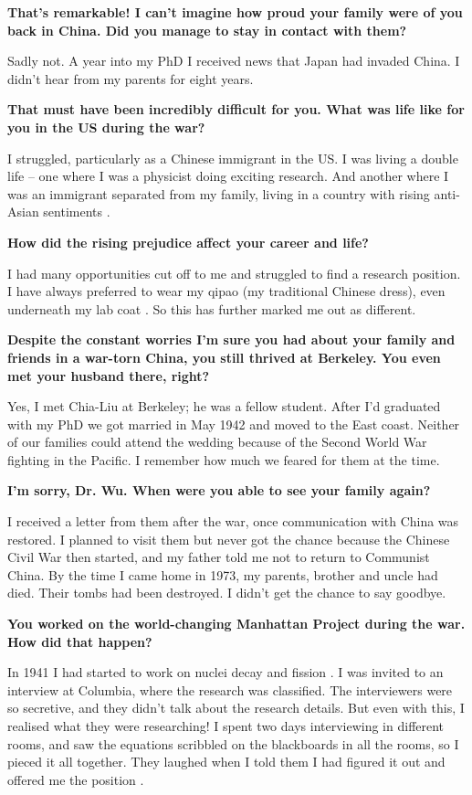 \documentclass{article}
\newcommand{\q}[1]{\vspace{10pt}
\textbf{#1}
\vspace{0pt}}
\begin{document}
\begin{multicols}{2}
\q{That’s remarkable! I can’t imagine how proud your family were of you back in China. Did you manage to stay in contact with them?}

Sadly not. A year into my PhD I received news that Japan had invaded China. I didn’t hear from my parents for eight years.

\q{That must have been incredibly difficult for you. What was life like for you in the US during the war?}

I struggled, particularly as a Chinese immigrant in the US. I was living a double life – one where I was a physicist doing exciting research. And another where I was an immigrant separated from my family, living in a country with rising anti-Asian sentiments \cite{N2}.

\q{How did the rising prejudice affect your career and life?}

I had many opportunities cut off to me and struggled to find a research position. I have always preferred to wear my qipao (my traditional Chinese dress), even underneath my lab coat \cite{N3}. So this has further marked me out as different.

\q{Despite the constant worries I’m sure you had about your family and friends in a war-torn China, you still thrived at Berkeley. You even met your husband there, right?}

Yes, I met Chia-Liu at Berkeley; he was a fellow student. After I’d graduated with my PhD we got married in May 1942 and moved to the East coast. \cite{N6} Neither of our families could attend the wedding because of the Second World War fighting in the Pacific. I remember how much we feared for them at the time.

\q{I’m sorry, Dr. Wu. When were you able to see your family again?}

I received a letter from them after the war, once communication with China was restored. I planned to visit them but never got the chance because the Chinese Civil War then started, and my father told me not to return to Communist China. By the time I came home in 1973, my parents, brother and uncle had died. Their tombs had been destroyed. I didn't get the chance to say goodbye.

\q{You worked on the world-changing Manhattan Project during the war. How did that happen?}

In 1941 I had started to work on nuclei decay and fission \cite{N4}. I was invited to an interview at Columbia, where the research was classified. The interviewers were so secretive, and they didn’t talk about the research details. But even with this, I realised what they were researching! I spent two days interviewing in different rooms, and saw the equations scribbled on the blackboards in all the rooms, so I pieced it all together. They laughed when I told them I had figured it out and offered me the position \cite{N4}.


\end{multicols}
\end{document}
